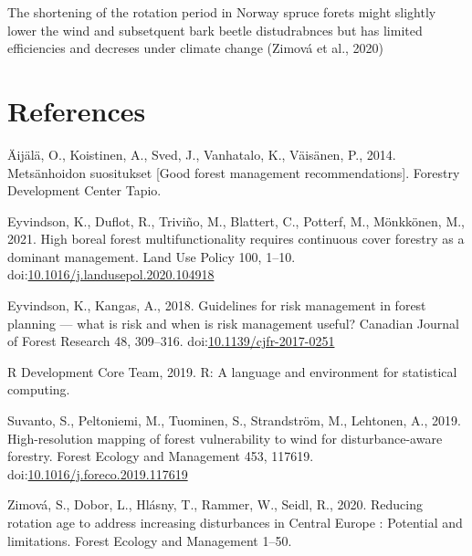 \documentclass[]{elsarticle} %
\begin{document}
The shortening of the rotation period in Norway spruce forets might
slightly lower the wind and subsetquent bark beetle distudrabnces but
has limited efficiencies and decreses under climate change (Zimová et
al., 2020)

\section*{References}\label{references}

\hypertarget{refs}{}
\hypertarget{ref-Aijala2014a}{}
Äijälä, O., Koistinen, A., Sved, J., Vanhatalo, K., Väisänen, P., 2014.
Metsänhoidon suositukset {[}Good forest management recommendations{]}.
Forestry Development Center Tapio.

\hypertarget{ref-Eyvindson2020}{}
Eyvindson, K., Duflot, R., Triviño, M., Blattert, C., Potterf, M.,
Mönkkönen, M., 2021. High boreal forest multifunctionality requires
continuous cover forestry as a dominant management. Land Use Policy 100,
1--10.
doi:\href{https://doi.org/10.1016/j.landusepol.2020.104918}{10.1016/j.landusepol.2020.104918}

\hypertarget{ref-Eyvindson2018}{}
Eyvindson, K., Kangas, A., 2018. Guidelines for risk management in
forest planning --- what is risk and when is risk management useful?
Canadian Journal of Forest Research 48, 309--316.
doi:\href{https://doi.org/10.1139/cjfr-2017-0251}{10.1139/cjfr-2017-0251}

\hypertarget{ref-RDevelopmentCoreTeam2019}{}
R Development Core Team, 2019. R: A language and environment for
statistical computing.

\hypertarget{ref-Suvanto2019}{}
Suvanto, S., Peltoniemi, M., Tuominen, S., Strandström, M., Lehtonen,
A., 2019. High-resolution mapping of forest vulnerability to wind for
disturbance-aware forestry. Forest Ecology and Management 453, 117619.
doi:\href{https://doi.org/10.1016/j.foreco.2019.117619}{10.1016/j.foreco.2019.117619}

\hypertarget{ref-Zimova2020}{}
Zimová, S., Dobor, L., Hlásny, T., Rammer, W., Seidl, R., 2020. Reducing
rotation age to address increasing disturbances in Central Europe :
Potential and limitations. Forest Ecology and Management 1--50.
\end{document}
